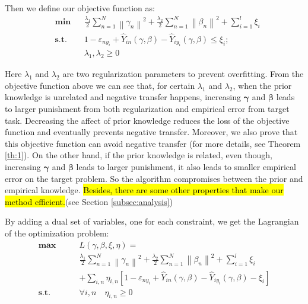 Then we define our objective function as:
\begin{equation}\label{loss}
\begin{aligned}
& \textbf{min}
& & \frac{{{\lambda _1}}}{2}\sum\limits_{n = 1}^N {{{\left\| {{\gamma _n}} \right\|}^2}}  + \frac{{{\lambda _2}}}{2}\sum\limits_{n = 1}^N {{{\left\| {{\beta _n}} \right\|}^2}}  + \sum\limits_{i = 1}^l {{\xi _i}}   \\
& \textbf{s.t.}
& & 1 - {\varepsilon _{n{y_i}}} + {\hat Y_{in}}\left( {\gamma ,\beta } \right) - {\hat Y_{i{y_i}}}\left( {\gamma ,\beta } \right) \le {\xi_i};\\
& & &\lambda_1,\lambda_2 \ge 0
\end{aligned}
\end{equation}

Here $\lambda_1$ and $\lambda_2$ are two regularization parameters to prevent overfitting. 
From the objective function above we can see that, for certain $\lambda_1$ and $\lambda_2$, when the prior knowledge is unrelated and negative transfer happens, increasing $\boldsymbol{\gamma}$ and $\boldsymbol{\beta}$ leads to larger punishment from both regularization and empirical error from target task. Decreasing the affect of prior knowledge reduces the loss of the objective function and eventually prevents negative transfer. Moreover, we also prove that this objective function can avoid negative transfer (for more details, see Theorem \ref{th:1}). On the other hand, if the prior knowledge is related, even though, increasing $\boldsymbol{\gamma}$ and $\boldsymbol{\beta}$ leads to larger punishment, it also leads to smaller empirical error on the target problem. So the algorithm compromises between the prior and empirical knowledge. \hl{Besides, there are some other properties that make our method efficient.}(see Section \ref{subsec:analysis})


By adding a dual set of variables, one for each constraint, we get the Lagrangian of the optimization problem:
\begin{equation}\label{eq:dual}
\begin{aligned}
 \textbf{max}\qquad {}& L\left( {\gamma ,\beta ,\xi ,\eta } \right) =\\
 &\frac{{{\lambda _1}}}{2}\sum\limits_{n = 1}^N {{{\left\| {{\gamma _n}} \right\|}^2}}  + \frac{{{\lambda _2}}}{2}\sum\limits_{n = 1}^N {{{\left\| {{\beta _n}} \right\|}^2}}  + \sum\limits_{i = 1}^l {{\xi _i}} \\
   &+ \sum\limits_{i,n} {{\eta _{i,n}}\left[ {1 - {\varepsilon _{n{y_i}}} + {{\hat Y}_{in}}\left( {\gamma ,\beta } \right) - {{\hat Y}_{i{y_i}}}\left( {\gamma ,\beta } \right) - {\xi _i}} \right]}  \\
 \textbf{s.t.} \qquad {} & \forall i,n \quad {} {\eta _{i,n}} \ge 0
\end{aligned}
\end{equation}

